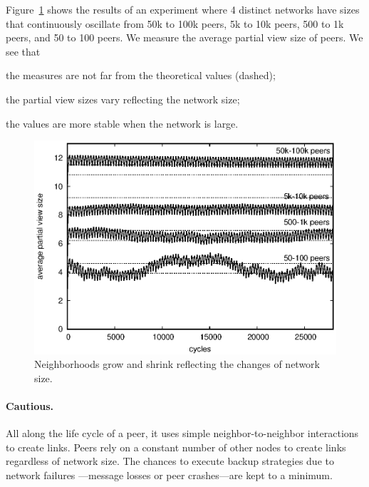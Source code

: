 \noindent Figure~\ref{fig:extended} shows the results of an experiment
where 4 distinct networks have sizes that continuously oscillate from
50k to 100k peers, 5k to 10k peers, 500 to 1k peers, and 50 to 100
peers. We measure the average partial view size of peers. We see that
\begin{inparaenum}[(i)]
\item the measures are not far from the theoretical values (dashed);
\item the partial view sizes vary reflecting the network size;
\item the values are more stable when the network is large.
\end{inparaenum}




\begin{figure}
  \begin{center}
    \includegraphics[width=\SCALE\textwidth]{./img/extended.eps}
    \caption{\label{fig:extended} Neighborhoods grow and shrink reflecting the
      changes of network size.}
  \end{center}
\end{figure}


\paragraph{Cautious.}
All along the life cycle of a peer, it uses simple
neighbor-to-neighbor interactions to create links.  Peers rely on a
constant number of other nodes to create links regardless of network
size. The chances to execute backup strategies due to network failures
---message losses or peer crashes---are kept to a minimum.


